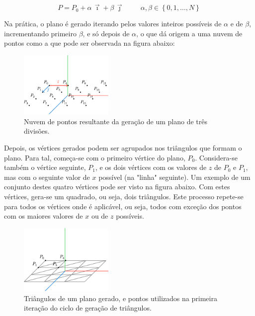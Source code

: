\documentclass[12pt, a4paper]{article}
\begin{document}
$$
P = P_0 + \alpha \, \vec{\imath} + \beta \, \vec{\jmath}
\hspace{1cm}
\alpha, \beta \in \left \lbrace 0, 1, \ldots, N \right \rbrace
$$

Na prática, o plano é gerado iterando pelos valores inteiros possíveis de $\alpha$ e de $\beta$,
incrementando primeiro $\beta$, e só depois de $\alpha$, o que dá origem a uma nuvem de pontos como
a que pode ser observada na figura abaixo:

\begin{figure}[H]
    \centering
    \includegraphics[width=0.4\textwidth]{res/figures/PlanePoints.pdf}
    \caption{Nuvem de pontos resultante da geração de um plano de três divisões.}
\end{figure}

Depois, os vértices gerados podem ser agrupados nos triângulos que formam o plano. Para tal,
começa-se com o primeiro vértice do plano, $P_0$. Considera-se também o vértice seguinte, $P_1$, e
os dois vértices com os valores de $z$ de $P_0$ e $P_1$, mas com o seguinte valor de $x$ possível
(na "linha"{} seguinte). Um exemplo de um conjunto destes quatro vértices pode ser visto na figura
abaixo. Com estes vértices, gera-se um quadrado, ou seja, dois triângulos. Este processo repete-se
para todos os vértices onde é aplicável, ou seja, todos com exceção dos pontos com os maiores
valores de $x$ ou de $z$ possíveis.

\begin{figure}[H]
    \centering
    \includegraphics[width=0.4\textwidth]{res/figures/PlaneTriangles.pdf}
    \caption{
        Triângulos de um plano gerado, e pontos utilizados na primeira iteração do ciclo de geração
        de triângulos.
    }
\end{figure}
\end{document}
